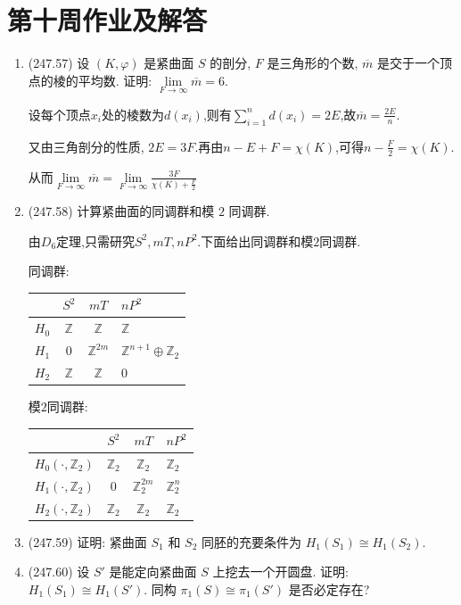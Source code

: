 \section{第十周作业及解答}
\begin{enumerate}

    \item(247.57) 设 $(K, \varphi)$ 是紧曲面 $S$ 的剖分, 
    $F$ 是三角形的个数, $\overline{m}$ 是交于一个顶点的棱的平均数. 
    证明: $\lim\limits_{F\to\infty} \overline{m} = 6$.
    \begin{proofc}[解答]
        设每个顶点$x_i$处的棱数为$d(x_i)$,则有$\sum\limits^n_{i=1}d(x_i)=2E$,故$\overline{m}=\frac{2E}{n}$.\par
        又由三角剖分的性质, $2E=3F$.再由$n-E+F=\chi(K)$,可得$n-\frac{F}{2}=\chi(K)$.\par
        从而$\lim\limits_{F\to\infty} \overline{m} = \lim\limits_{F\to\infty}\frac{3F}{\chi(K)+\frac{F}{2}}$
    \end{proofc}
    \item(247.58) 计算紧曲面的同调群和模 $2$ 同调群.
    \begin{proofc}[解答]
        由$D_6$定理,只需研究$S^2,mT,nP^2$.下面给出同调群和模$2$同调群.\par
        同调群:
        \begin{center}
\begin{tabular}{|c|c|c|} %
    \hline
      & $S^2$ & $mT$ & $nP^2$ \\
    \hline
    $H_0$ & $\mathbb{Z}$ & $\mathbb{Z}$ & $\mathbb{Z}$\\
    \hline
    $H_1$ & $0$ & $\mathbb{Z}^{2m}$ & $\mathbb{Z}^{n+1}\oplus\mathbb{Z}_2$ \\
    \hline
    $H_2$ & $\mathbb{Z}$ & $\mathbb{Z}$ & $0$ 
\end{tabular}
\end{center}
模$2$同调群:
\begin{center}
\begin{tabular}{|c|c|c|} %
    \hline
      & $S^2$ & $mT$ & $nP^2$ \\
    \hline
    $H_0(\cdot,\mathbb{Z}_2)$ & $\mathbb{Z}_2$ & $\mathbb{Z}_2$ & $\mathbb{Z}_2$\\
    \hline
    $H_1(\cdot,\mathbb{Z}_2)$ & $0$ & $\mathbb{Z}_2^{2m}$ & $\mathbb{Z}_2^{n}$ \\
    \hline
    $H_2(\cdot,\mathbb{Z}_2)$ & $\mathbb{Z}_2$ & $\mathbb{Z}_2$ & $\mathbb{Z}_2$ 
    \hline
\end{tabular}
\end{center}
    \end{proofc}
    \item(247.59) 证明: 紧曲面 $S_1$ 和 $S_2$ 同胚的充要条件为 $H_1(S_1) \cong H_1(S_2)$.
    
    \item(247.60) 设 $S'$ 是能定向紧曲面 $S$ 上挖去一个开圆盘. 证明: $H_1(S_1) \cong H_1(S')$. 同构 $\pi_1(S) \cong \pi_1(S')$ 是否必定存在?
    
\end{enumerate}

